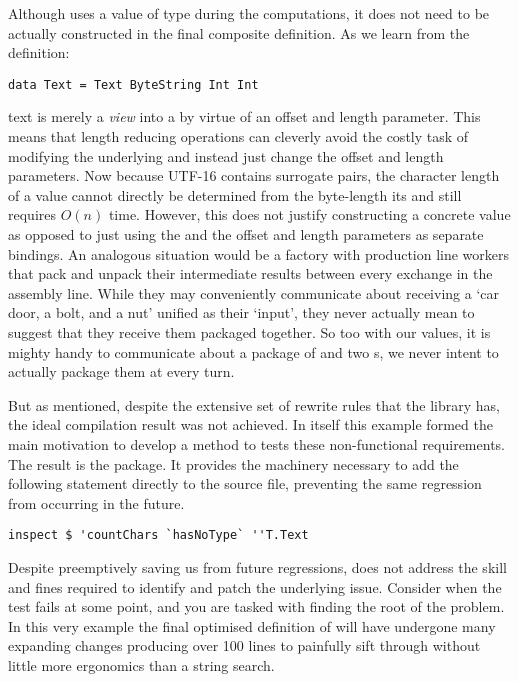 Although  uses a value of type  during the computations, it does not
need to be actually constructed in the final composite definition. As we learn from the definition:

\begin{verbatim}
data Text = Text ByteString Int Int
\end{verbatim}

 text is merely a \textit{view} into a 
by virtue of an offset and length parameter. This means that length reducing operations can cleverly avoid the
costly task of modifying the underlying  and instead just change the offset and length parameters.
Now because UTF-16 contains surrogate pairs, the character length of a  value cannot directly be determined
from the byte-length its  and still requires $O(n)$ time. However, this does not justify constructing
a concrete  value as opposed to just using the  and the offset and length parameters as
separate bindings. An analogous situation would be a factory with production line workers that
pack and unpack their intermediate results between every exchange in the assembly line. While they may
conveniently communicate about receiving a `car door, a bolt, and a nut' unified as their `input', they
never actually mean to suggest that they receive them packaged together. So too with our  values,
it is mighty handy to communicate about a package of  and two s, we never intent to
actually package them at every turn.

But as mentioned, despite the extensive set of rewrite rules that the  library has, the
ideal compilation result was not achieved. In itself this example formed the main motivation to 
develop a method to tests these non-functional requirements.
The result is the  package. 
It provides the machinery necessary to add the following statement
directly to the source file, preventing the same regression from occurring in the future.

\begin{verbatim}
inspect $ 'countChars `hasNoType` ''T.Text
\end{verbatim}

Despite preemptively saving us from future regressions,  does not address the 
skill and fines required to identify and patch the underlying issue. Consider when the test fails at
some point, and you are tasked with finding the root of the problem. In this very example the final 
optimised definition of  will have undergone many expanding changes producing 
over 100 lines to painfully sift through without little more ergonomics than a string search. 

